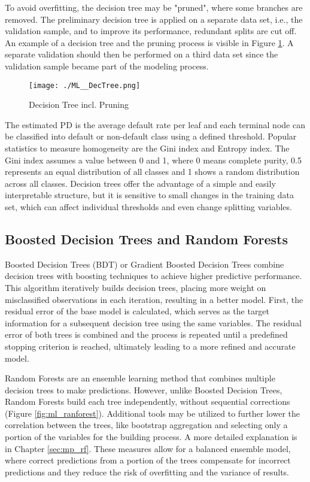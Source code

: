 To avoid overfitting, the decision tree may be "pruned", where some branches are removed. The preliminary decision tree is applied on a separate data set, i.e., the validation sample, and to improve its performance, redundant splits are cut off. An example of a decision tree and the pruning process is visible in Figure \ref{fig:ml_dectree}. A separate validation should then be performed on a third data set since the validation sample became part of the modeling process. 

\begin{figure}[H]
	\centering
	\texttt{[image: ./ML\_\_DecTree.png]}
    \caption{Decision Tree incl. Pruning}
    \label{fig:ml_dectree}
\end{figure}

The estimated PD is the average default rate per leaf and each terminal node can be classified into default or non-default class using a defined threshold. Popular statistics to measure homogeneity are the Gini index and Entropy index. The Gini index assumes a value between 0 and 1, where 0 means complete purity, 0.5 represents an equal distribution of all classes and 1 shows a random distribution across all classes. Decision trees offer the advantage of a simple and easily interpretable structure, but it is sensitive to small changes in the training data set, which can affect individual thresholds and even change splitting variables. \cite[pp.~21-22]{locatelli:2022}

\subsection{Boosted Decision Trees and Random Forests} 
Boosted Decision Trees (BDT) or Gradient Boosted Decision Trees combine decision trees with boosting techniques to achieve higher predictive performance. This algorithm iteratively builds decision trees, placing more weight on misclassified observations in each iteration, resulting in a better model. First, the residual error of the base model is calculated, which serves as the target information for a subsequent decision tree using the same variables. The residual error of both trees is combined and the process is repeated until a predefined stopping criterion is reached, ultimately leading to a more refined and accurate model.

Random Forests are an ensemble learning method that combines multiple decision trees to make predictions. However, unlike Boosted Decision Trees, Random Forests build each tree independently, without sequential corrections (Figure \ref{fig:ml_ranforest}). Additional tools may be utilized to further lower the correlation between the trees, like bootstrap aggregation and selecting only a portion of the variables for the building process. A more detailed explanation is in Chapter \ref{sec:mp_rf}. These measures allow for a balanced ensemble model, where correct predictions from a portion of the trees compensate for incorrect predictions and they reduce the risk of overfitting and the variance of results. \cite[pp.~22-24]{locatelli:2022}

